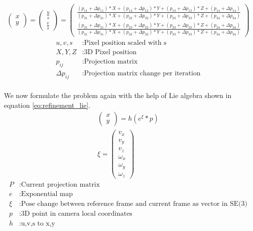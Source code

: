 \documentclass[11pt,a4paper,titlepage,oneside]{report}
\begin{document}
\begin{equation}\label{eq:refinement_projection}
  \begin{gathered}
    \begin{pmatrix}
      x \\
      y 
    \end{pmatrix}=
    \begin{pmatrix}
      \frac{u}{s} \\
      \frac{v}{s} 
    \end{pmatrix}=
    \begin{pmatrix}
      \frac{(p_{11} + \Delta p_{11})*X + (p_{12} + \Delta p_{12})*Y + (p_{13} + \Delta p_{13})*Z + (p_{14} + \Delta p_{14})}{(p_{31}+\Delta p_{31})*X + (p_{32} + \Delta p_{32})*Y + (p_{33} + \Delta p_{33})*Z + (p_{34} + \Delta p_{34})}  \\
      \frac{(p_{21} + \Delta p_{21})*X + (p_{22} + \Delta p_{22})*Y + (p_{23} + \Delta p_{23})*Z + (p_{24} + \Delta p_{24})}{(p_{31}+\Delta p_{31})*X + (p_{32} + \Delta p_{32})*Y + (p_{33} + \Delta p_{33})*Z + (p_{34} + \Delta p_{34})}
    \end{pmatrix}
  \end{gathered}
\end{equation}
\begin{align*}
  u,v,s           &:  \text{Pixel position scaled with s}\\
  X,Y,Z           &:  \text{3D Pixel position}\\
  p_{ij}          &:  \text{Projection matrix}\\
  \Delta p_{ij}   &:  \text{Projection matrix change per iteration}\\
\end{align*}

We now formulate the problem again with the help of Lie algebra shown in equation \ref{eq:refinement_lie}.
\begin{equation}\label{eq:refinement_lie}
  \begin{gathered}
    \begin{pmatrix}
      x\\
      y
    \end{pmatrix}
    =h(e^{\xi}*p)\\
    \xi=\begin{pmatrix}
      v_x\\
      v_y\\
      v_z\\
      \omega_x\\
      \omega_y\\
      \omega_z
    \end{pmatrix}
  \end{gathered}
\end{equation}
\begin{align*}
  P     &: \text{Current projection matrix}\\
  e     &: \text{Exponential map}\\
  \xi   &: \text{Pose change between reference frame and current frame as vector in SE(3)}\\
  p     &: \text{3D point in camera local coordinates}\\
  h     &: \text{u,v,s to x,y}
\end{align*}
\end{document}
